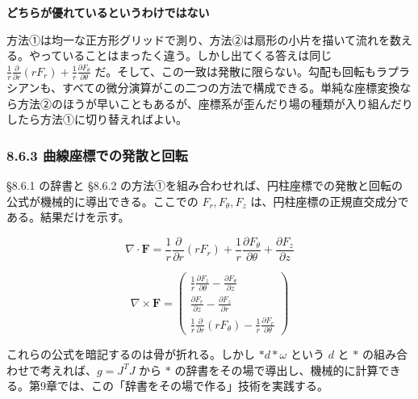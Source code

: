 \documentclass[a4paper,12pt,openany]{book}
\begin{document}
\textbf{どちらが優れているというわけではない}

方法①は均一な正方形グリッドで測り、方法②は扇形の小片を描いて流れを数える。やっていることはまったく違う。しかし出てくる答えは同じ
\(\frac{1}{r}\frac{\partial}{\partial r}(rF_r) + \frac{1}{r}\frac{\partial F_\theta}{\partial\theta}\)
だ。そして、この一致は発散に限らない。勾配も回転もラプラシアンも、すべての微分演算がこの二つの方法で構成できる。単純な座標変換なら方法②のほうが早いこともあるが、座標系が歪んだり場の種類が入り組んだりしたら方法①に切り替えればよい。

\hypertarget{ux66f2ux7ddaux5ea7ux6a19ux3067ux306eux767aux6563ux3068ux56deux8ee2}{%
\subsubsection{8.6.3
曲線座標での発散と回転}\label{ux66f2ux7ddaux5ea7ux6a19ux3067ux306eux767aux6563ux3068ux56deux8ee2}}

§8.6.1 の辞書と §8.6.2
の方法①を組み合わせれば、円柱座標での発散と回転の公式が機械的に導出できる。ここでの
\(F_r,F_\theta,F_z\) は、円柱座標の正規直交成分である。結果だけを示す。

\[\nabla \cdot \mathbf{F} = \frac{1}{r}\frac{\partial}{\partial r}(r F_r) + \frac{1}{r}\frac{\partial F_\theta}{\partial \theta} + \frac{\partial F_z}{\partial z}\]

\[\nabla \times \mathbf{F} = \begin{pmatrix}
\frac{1}{r}\frac{\partial F_z}{\partial \theta} - \frac{\partial F_\theta}{\partial z} \\[0.3em]
\frac{\partial F_r}{\partial z} - \frac{\partial F_z}{\partial r} \\[0.3em]
\frac{1}{r}\frac{\partial}{\partial r}(r F_\theta) - \frac{1}{r}\frac{\partial F_r}{\partial \theta}
\end{pmatrix}\]

これらの公式を暗記するのは骨が折れる。しかし \(\ast d\ast\omega\) という
\(d\) と \(\ast\) の組み合わせで考えれば、\(g = J^T J\) から \(\ast\)
の辞書をその場で導出し、機械的に計算できる。第9章では、この「辞書をその場で作る」技術を実践する。
\end{document}
